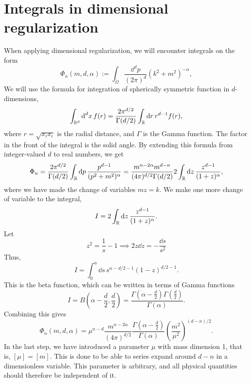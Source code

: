 \section{Integrals in dimensional regularization}
\label{section: integral}


When applying dimensional regularization, we will encounter integrals on the form
%
\begin{equation}
    \label{def dimreg integral}
    \Phi_n(m, d, \alpha) 
    := \int_{\tilde \Omega} \frac{\dd^d p}{(2 \pi)^d} (k^2 + m^2)^{-\alpha},
\end{equation}
%
We will use the formula for integration of spherically symmetric function in $d$-dimensions,
%
\begin{equation}
    \int_{\mathbb{R}^d} \text{d}^d x \, f(r) 
    = \frac{2 \pi^{d/2}}{\Gamma(d/2)} \int_{\mathbb{R}} \text{d} r \, r^{d-1}f(r),
\end{equation}
where $r = \sqrt{x_i x_i}$ is the radial distance, and $\Gamma$ is the Gamma function.
The factor in the front of the integral is the solid angle.
By extending this formula from integer-valued $d$ to real numbers, we get
%
\begin{equation}
    \Phi_n
    = \frac{2 \pi^{d/2} }{\Gamma(d/2)} \int_{\mathbb{R}} \text{d} p \, 
    \frac{p^{d-1}}{(p^2 + m^2)^\alpha}
    = \frac{m^{n-2\alpha}m^{d-n} }{(4 \pi)^{d / 2}\Gamma(d/2)} 
    2 \int_{\mathbb{R}} \text{d} z \, \frac{z^{d - 1}}{(1 + z)^\alpha}, 
\end{equation}
%
where we have made the change of variables $m z = k$.
We make one more change of variable to the integral,
%
\begin{equation}
    I = 2 \int_{\mathbb{R}} \text{d} z \, \frac{z^{d - 1}}{(1 + z)^\alpha}.
\end{equation}
%
Let
%
\begin{equation}
    z^2 = \frac{1}{s} - 1 \implies 2 z \dd z = - \frac{\dd s}{s^2}
\end{equation}
%
Thus,
%
\begin{equation}
    I = \int_0^a \dd s \, s^{\alpha - d/2 - 1} (1 - z)^{d/2 - 1}.
\end{equation}
%
This is the beta function, which can be written in terms of Gamma functions~\autocite{peskinIntroductionQuantumField1995}
%
\begin{equation}
    I = B\left(\alpha - \frac{d}{2}, \frac{d}{2}\right) 
    = \frac{\Gamma\left(\alpha - \frac{d}{2}\right) \Gamma\left(\frac{d}{2}\right)}{\Gamma(\alpha)}.
\end{equation}
%
Combining this gives
%
\begin{equation}
    \label{result dimreg}
    \Phi_n(m, d, \alpha) 
    = \mu^{n-d} \frac{m^{n - 2\alpha}}{(4 \pi)^{d / 2}}
    \frac{
        \Gamma \left(\alpha - \frac{d}{2} \right) 
    }
    {\Gamma(\alpha)}
    \left(\frac{m^2}{\mu^2}\right)^{(d-n)/2 }
    .
\end{equation}
%
In the last step, we have introduced a parameter $\mu$ with mass dimension 1, that is, $[\mu] = [m]$.
This is done to be able to series expand around $d - n$ in a dimensionless variable. 
This parameter is arbitrary, and all physical quantities should therefore be independent of it.



